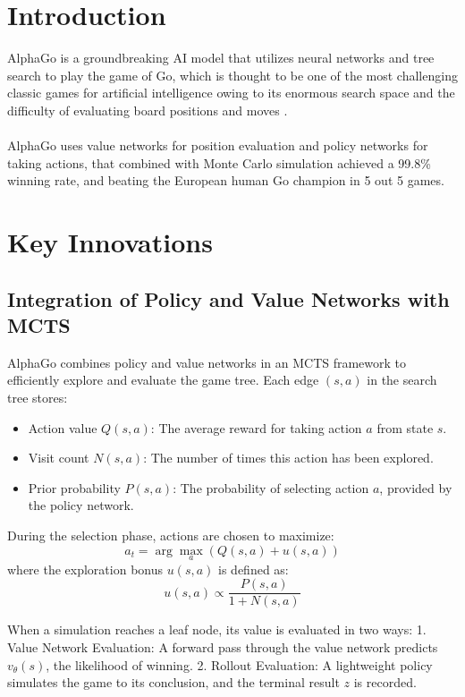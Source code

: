 \section{Introduction}
AlphaGo is a groundbreaking AI model that utilizes neural networks and tree search to play the game of Go, which is thought to be one of the most challenging classic games for artificial intelligence owing to its enormous search space and the difficulty of evaluating board positions and moves \cite{Silver2016}.
\\\\
AlphaGo uses value networks for position evaluation and policy networks for taking actions, that combined with Monte Carlo simulation achieved a 99.8\% winning rate, and beating the European human Go champion in 5 out 5 games.

\section{Key Innovations}

\subsection{Integration of Policy and Value Networks with MCTS}
AlphaGo combines policy and value networks in an MCTS framework to efficiently explore and evaluate the game tree. Each edge \( (s, a) \) in the search tree stores:
\begin{itemize}
    \item Action value \( Q(s, a) \): The average reward for taking action \( a \) from state \( s \).
    \item Visit count \( N(s, a) \): The number of times this action has been explored.
    \item Prior probability \( P(s, a) \): The probability of selecting action \( a \), provided by the policy network.
\end{itemize}

During the selection phase, actions are chosen to maximize:
\[
a_t = \arg\max_a \left( Q(s, a) + u(s, a) \right)
\]
where the exploration bonus \( u(s, a) \) is defined as:
\[
u(s, a) \propto \frac{P(s, a)}{1 + N(s, a)}
\]

When a simulation reaches a leaf node, its value is evaluated in two ways:
1. Value Network Evaluation: A forward pass through the value network predicts \( v_\theta(s) \), the likelihood of winning.
2. Rollout Evaluation: A lightweight policy simulates the game to its conclusion, and the terminal result \( z \) is recorded.

